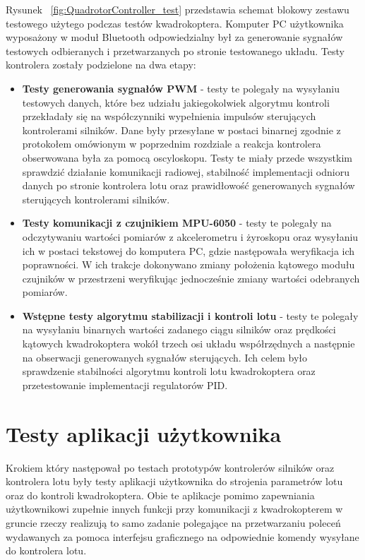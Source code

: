Rysunek ~\ref{fig:QuadrotorController_test} przedstawia schemat blokowy zestawu testowego użytego podczas testów kwadrokoptera. Komputer PC użytkownika wyposażony w moduł Bluetooth odpowiedzialny był za generowanie sygnałów testowych odbieranych i przetwarzanych po stronie testowanego układu. Testy kontrolera zostały podzielone na dwa etapy:
\begin{itemize}
	\item \textbf{Testy generowania sygnałów PWM} - testy te polegały na wysyłaniu testowych danych, które bez udziału jakiegokolwiek algorytmu kontroli przekładały się na współczynniki wypełnienia impulsów sterujących kontrolerami silników. Dane były przesyłane w postaci binarnej zgodnie z protokołem omówionym w poprzednim rozdziale a reakcja kontrolera obserwowana była za pomocą oscyloskopu. Testy te miały przede wszystkim sprawdzić działanie komunikacji radiowej, stabilność implementacji odnioru danych po stronie kontrolera lotu oraz prawidłowość generowanych sygnałów sterujących kontrolerami silników.
	\item \textbf{Testy komunikacji z czujnikiem MPU-6050} - testy te polegały na odczytywaniu wartości pomiarów z akcelerometru i żyroskopu oraz wysyłaniu ich w postaci tekstowej do komputera PC, gdzie następowała weryfikacja ich poprawności. W ich trakcje dokonywano zmiany położenia kątowego modułu czujników w przestrzeni weryfikując jednocześnie zmiany wartości odebranych pomiarów.  
	\item \textbf{Wstępne testy algorytmu stabilizacji i kontroli lotu} - testy te polegały na wysyłaniu binarnych wartości zadanego ciągu silników oraz prędkości kątowych kwadrokoptera wokół trzech osi układu współrzędnych a następnie na obserwacji generowanych sygnałów sterujących. Ich celem było sprawdzenie stabilności algorytmu kontroli lotu kwadrokoptera oraz przetestowanie implementacji regulatorów PID.   
\end{itemize}


\section{Testy aplikacji użytkownika}

Krokiem który następował po testach prototypów kontrolerów silników oraz kontrolera lotu były testy aplikacji użytkownika do strojenia parametrów lotu oraz do kontroli kwadrokoptera. Obie te aplikacje pomimo zapewniania użytkownikowi zupełnie innych funkcji przy komunikacji z kwadrokopterem w gruncie rzeczy realizują to samo zadanie polegające na przetwarzaniu poleceń wydawanych za pomoca interfejsu graficznego na odpowiednie komendy wysyłane do kontrolera lotu. 

